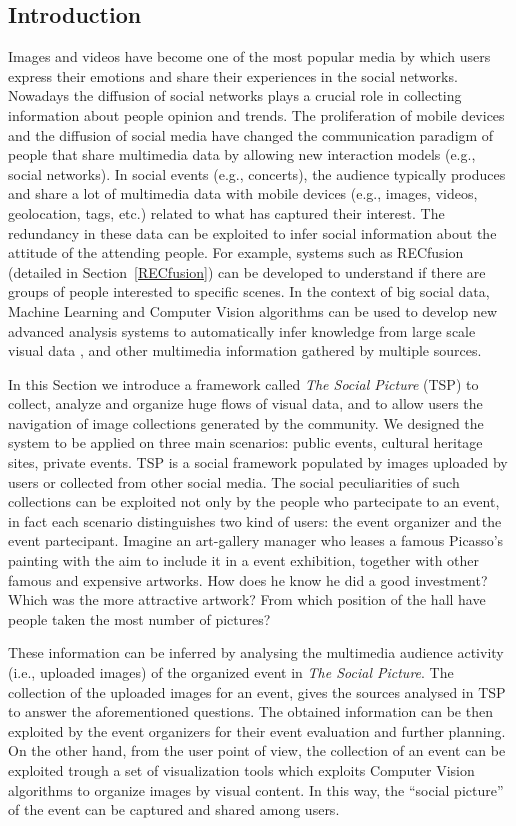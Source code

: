 \subsection{Introduction}
Images and videos have become one of the most popular media by which users express their emotions and share their experiences in the social networks. Nowadays the diffusion of social networks plays a crucial role in collecting information about people opinion and trends.
The proliferation of mobile devices and the diffusion of social media have changed the communication paradigm of people that share multimedia data by allowing new interaction models (e.g., social networks). In social events (e.g., concerts), the audience typically produces and share a lot of multimedia data with mobile devices (e.g., images, videos, geolocation, tags, etc.) related to what has captured their interest. The redundancy in these data can be exploited to infer social information about the attitude of the attending people. For example, systems such as RECfusion \cite{Ortis2015n525} (detailed in Section~\ref{RECfusion}) can be developed to understand if there are groups of people interested to specific scenes. In the context of big social data, Machine Learning and Computer Vision algorithms can be used to develop new advanced analysis systems to automatically infer knowledge from large scale visual data \cite{weyand2015visual}, and other multimedia information gathered by multiple sources.

In this Section we introduce a framework called \textit{The Social Picture} (TSP) to collect, analyze and organize huge flows of visual data, and to allow users the navigation of image collections generated by the community.
We designed the system to be applied on three main scenarios: public events, cultural heritage sites, private events. TSP is a social framework populated by images uploaded by users or collected from other social media. The social peculiarities of such collections can be exploited not only by the people who partecipate to an event, in fact each scenario distinguishes two kind of users: the event organizer and the event partecipant.
Imagine an art-gallery manager who leases a famous Picasso's painting with the aim to include it in a event exhibition, together with other famous and expensive artworks. How does he know he did a good investment? Which was the more attractive artwork? From which position of the hall have people taken the most number of pictures?

These information can be inferred by analysing the multimedia audience activity (i.e., uploaded images) of the organized event in \textit{The Social Picture}. The collection of the uploaded images for an event, gives the sources analysed in TSP to answer the aforementioned questions. The obtained information can be then exploited by the event organizers for their event evaluation and further planning.
On the other hand, from the user point of view, the collection of an event can be exploited trough a set of visualization tools which exploits Computer Vision algorithms to organize images by visual content. In this way, the ``social picture'' of the event can be captured and shared among users.

